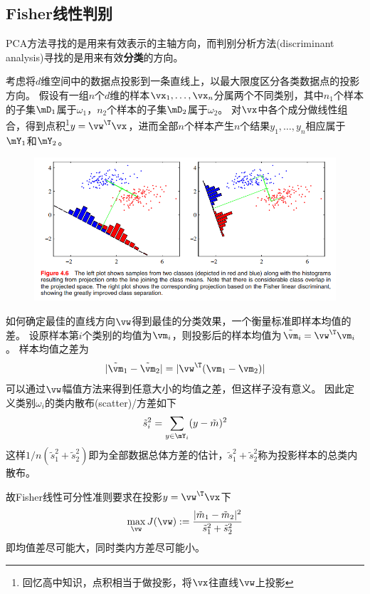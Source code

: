 
\subsection{Fisher线性判别}
PCA方法寻找的是用来有效表示的主轴方向，而判别分析方法(discriminant analysis)寻找的是用来有效\textbf{分类}的方向。

考虑将$d$维空间中的数据点投影到一条直线上，以最大限度区分各类数据点的投影方向。
假设有一组$n$个$d$维的样本$\vx_1,\ldots,\vx_n$分属两个不同类别，其中$n_1$个样本的子集$\mD_1$属于$\omega_1$，$n_2$个样本的子集$\mD_2$属于$\omega_2$。
对$\vx$中各个成分做线性组合，得到点积\footnote{回忆高中知识，点积相当于做投影，将$\vx$往直线$\vw$上投影}$y=\vw^\T\vx$，进而全部$n$个样本产生$n$个结果$y_1,\ldots,y_n$相应属于$\mY_1$和$\mY_2$。
\begin{figure}[H]
\centering
\includegraphics[width=0.8\linewidth]{fig/Fisher.png}
\end{figure}

如何确定最佳的直线方向$\vw$得到最佳的分类效果，一个衡量标准即样本均值的差。
设原样本第$i$个类别的均值为$\vm_i$，则投影后的样本均值为$\tilde{\vm}_i=\vw^\T\vm_i$。
样本均值之差为
\[|\tilde{\vm}_1-\tilde{\vm}_2|=|\vw^\T(\vm_1-\vm_2)|\]
可以通过$\vw$幅值方法来得到任意大小的均值之差，但这样子没有意义。
因此定义类别$\omega_i$的类内散布(scatter)/方差如下
\[\tilde{s}_i^2=\sum_{y\in\mY_i}(y-\tilde{m})^2\]
这样$1/n(\tilde{s}_1^2+\tilde{s}_2^2)$即为全部数据总体方差的估计，$\tilde{s}_1^2+\tilde{s}_2^2$称为投影样本的总类内散布。

故Fisher线性可分性准则要求在投影$y=\vw^\T\vx$下
\[\max_{\vw} J(\vw):=\frac{|\tilde{m}_1-\tilde{m}_2|^2}{\tilde{s}_1^2+\tilde{s}_2^2}\]
即均值差尽可能大，同时类内方差尽可能小。

